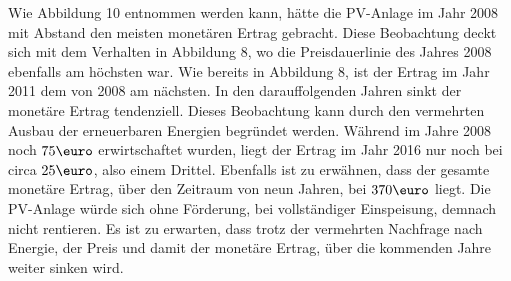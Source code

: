 \documentclass[a4paper,12pt]{article}
\begin{document}
	\noindent Wie Abbildung 10 entnommen werden kann, hätte die PV-Anlage im Jahr 2008 mit Abstand den meisten monetären Ertrag gebracht. Diese Beobachtung deckt sich mit dem Verhalten in Abbildung 8, wo die Preisdauerlinie des Jahres 2008 ebenfalls am höchsten war. Wie bereits in Abbildung 8, ist der Ertrag im Jahr 2011 dem von 2008 am nächsten. In den darauffolgenden Jahren sinkt der monetäre Ertrag tendenziell. Dieses Beobachtung kann durch den vermehrten Ausbau der erneuerbaren Energien begründet werden.\newline
	Während im Jahre 2008 noch $75\mbox{\euro}$ erwirtschaftet wurden, liegt der Ertrag im Jahr 2016 nur noch bei circa $25\mbox{\euro}$, also einem Drittel.\newline
	Ebenfalls ist zu erwähnen, dass der gesamte monetäre Ertrag, über den Zeitraum von neun Jahren, bei $370\mbox{\euro}$ liegt. Die PV-Anlage würde sich ohne Förderung, bei vollständiger Einspeisung, demnach nicht rentieren.\newline
	Es ist zu erwarten, dass trotz der vermehrten Nachfrage nach Energie, der Preis und damit der monetäre Ertrag, über die kommenden Jahre weiter sinken wird.
\end{document}
